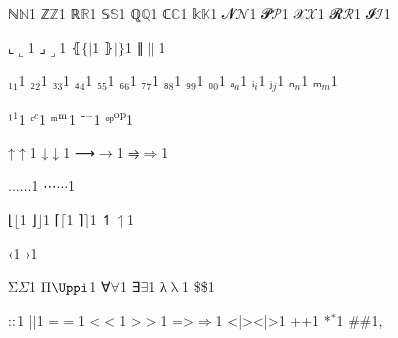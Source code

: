 {{ℕ}{{\ensuremath{\mathbb{N}}}}1
{ℤ}{{\ensuremath{\mathbb{Z}}}}1
{ℝ}{{\ensuremath{\mathbb{R}}}}1
{𝕊}{{\ensuremath{\mathbb{S}}}}1
{ℚ}{{\ensuremath{\mathbb{Q}}}}1
{ℂ}{{\ensuremath{\mathbb{C}}}}1
{𝕜}{{\ensuremath{\mathbb{K}}}}1
{𝓝}{{\ensuremath{\mathcal{N}}}}1
{𝓟}{{\ensuremath{\mathcal{P}}}}1
{𝒳}{{\ensuremath{\mathcal{X}}}}1
{𝓡}{{\ensuremath{\mathcal{R}}}}1
{𝓘}{{\ensuremath{\mathcal{I}}}}1


{⌞}{{\ensuremath{\llcorner}}}1
{⌟}{{\ensuremath{\lrcorner}}}1
{⦃}{{\ensuremath{\{\!|}}}1
{⦄}{{\ensuremath{|\!\}}}}1
{∥}{{\ensuremath{\|}}}1

{₁}{{\ensuremath{_1}}}1
{₂}{{\ensuremath{_2}}}1
{₃}{{\ensuremath{_3}}}1
{₄}{{\ensuremath{_4}}}1
{₅}{{\ensuremath{_5}}}1
{₆}{{\ensuremath{_6}}}1
{₇}{{\ensuremath{_7}}}1
{₈}{{\ensuremath{_8}}}1
{₉}{{\ensuremath{_9}}}1
{₀}{{\ensuremath{_0}}}1
{ₐ}{{\ensuremath{_a}}}1
{ᵢ}{{\ensuremath{_i}}}1
{ⱼ}{{\ensuremath{_j}}}1
{ₙ}{{\ensuremath{_n}}}1
{ₘ}{{\ensuremath{_m}}}1

{¹}{{\color{symbolcolor}\ensuremath{^1}}}1
{ᶜ}{{\color{symbolcolor}\ensuremath{^c}}}1
{ᵐ}{{\color{symbolcolor}\ensuremath{\textsuperscript{m}}}}1
{⁻}{{\color{symbolcolor}\ensuremath{^{-}}}}1
{ᵒᵖ}{{\color{symbolcolor}\textsuperscript{op}}}1

{↑}{{\color{symbolcolor}\ensuremath{\uparrow}}}1
{↓}{{\color{symbolcolor}\ensuremath{\downarrow}}}1
{⟶}{{\color{symbolcolor}\ensuremath{\longrightarrow}}}1
{⥤}{{\color{symbolcolor}\ensuremath{\Rightarrow}}}1

{...}{{\ensuremath{\ldots}}}1
{⋯}{{\color{symbolcolor}\ensuremath{\cdots}}}1

{⌊}{{\ensuremath{\lfloor}}}1
{⌋}{{\ensuremath{\rfloor}}}1
{⌈}{{\ensuremath{\lceil}}}1
{⌉}{{\ensuremath{\rceil}}}1
{↿}{{\ensuremath{\upharpoonleft}}}1

{‹}{{\guilsinglleft}}1
{›}{{\guilsinglright}}1

{Σ}{{\color{symbolcolor}\ensuremath{\Sigma}}}1
{Π}{{\color{symbolcolor}\ensuremath{\Uppi}}}1 %
{∀}{{\color{symbolcolor}\ensuremath{\forall}}}1
{∃}{{\color{symbolcolor}\ensuremath{\exists}}}1
{λ}{{\color{symbolcolor}\ensuremath{\uplambda}}}1
{\$}{{\color{symbolcolor}\$}}1

{:}{{\color{symbolcolor}\ensuremath{\vcentcolon}}}1
{|}{{\color{symbolcolor}\ensuremath{{|}}}}1
{=}{{\color{symbolcolor}\ensuremath{=}}}1
{<}{{\color{symbolcolor}\ensuremath{<}}}1
{>}{{\color{symbolcolor}\ensuremath{>}}}1
{=>}{{\color{symbolcolor}\ensuremath{\Rightarrow}}}1
{<|>}{{\color{symbolcolor}<|>}}1
{+}{{\color{symbolcolor}+}}1
{*}{{\color{symbolcolor}\ensuremath{{}^{*}}}}1
{\#}{{\color{keywordcolor}\#}}1, %

}
